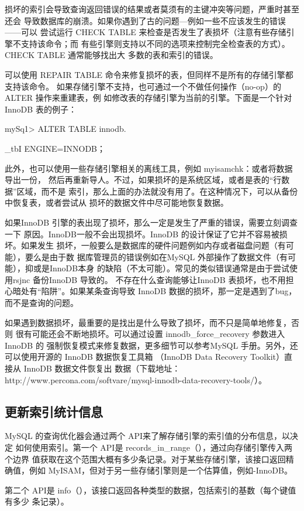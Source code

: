 损坏的索引会导致查询返回错误的结果或者莫须有的主键冲突等问题，严重时甚至还会
导致数据库的崩溃。如果你遇到了古的问题—例如一些不应该发生的错误——可以
尝试运行 CHECK TABLE 来检查是否发生了表损坏（注意有些存储引擎不支持该命令；而
有些引擎则支持以不同的选项来控制完全检查表的方式）。CHECK TABLE 通常能够找出大
多数的表和索引的错误。

可以使用 REPAIR TABLE 命令来修复损坏的表，但同样不是所有的存储引擎都支持该命令。
如果存储引擎不支持，也可通过一个不做任何操作（no-op）的ALTER 操作来重建表，例
如修改表的存储引擎为当前的引擎。下面是一个针对 InnoDB 表的例子：

mySq1> ALTER TABLE innodb.

\_tbI ENGINE=INNODB；

此外，也可以使用一些存储引擎相关的离线工具，例如 myisamchk：或者将数据导出一份，
然后再重新导人。不过，如果损坏的是系统区域，或者是表的“行数据”区域，而不是
索引，那么上面的办法就没有用了。在这种情况下，可以从备份中恢复表，或者尝试从
损坏的数据文件中尽可能地恢复数据。

如果InnoDB 引擎的表出现了损坏，那么一定是发生了严重的错误，需要立刻调查一下
原因。InnoDB一般不会出现损坏。InnoDB 的设计保证了它并不容易被损坏。如果发生
损坏，一般要么是数据库的硬件问题例如内存或者磁盘问题（有可能），要么是由于数
据库管理员的错误例如在MySQL 外部操作了数据文件（有可能），抑或是InnoDB本身
的缺陷（不太可能）。常见的类似错误通常是由于尝试使用rsjnc 备份InnoDB 导致的。
不存在什么查询能够让InnoDB 表损坏，也不用担心暗处有“陷阱”。如果某条查询导致
InnoDB 数据的损坏，那一定是遇到了bug，而不是查询的问题。

如果遇到数据损坏，最重要的是找出是什么导致了损坏，而不只是简单地修复，否则
很有可能还会不断地损坏。可以通过设置 innodb\_force\_recovery 参数进入InnoDB 的
强制恢复模式来修复数据，更多细节可以参考MySQL 手册。另外，还可以使用开源的
InnoDB 数据恢复工具箱 （InnoDB Data Recovery Toolkit）直接从 InnoDB 数据文件恢复出
数据（下载地址：http://www.percona.com/softvare/mysql-innodb-data-recovery-tools/）。

\subsection{更新索引统计信息}
MySQL 的查询优化器会通过两个 API来了解存储引擎的索引值的分布信息，以决定
如何使用索引。第一个 API是 records\_in\_range（），通过向存储引擎传入两个边界
值获取在这个范围大概有多少条记录。对于某些存储引擎，该接口返回精确值，例如
MyISAM，但对于另一些存储引擎则是一个估算值，例如-InnoDB。

第二个 API是 info（），该接口返回各种类型的数据，包括索引的基数（每个键值有多少
条记录）。

